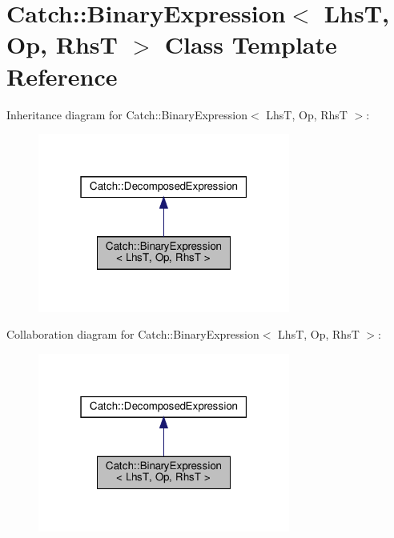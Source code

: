 \hypertarget{classCatch_1_1BinaryExpression}{}\section{Catch\+:\+:Binary\+Expression$<$ LhsT, Op, RhsT $>$ Class Template Reference}
\label{classCatch_1_1BinaryExpression}


Inheritance diagram for Catch\+:\+:Binary\+Expression$<$ LhsT, Op, RhsT $>$\+:\nopagebreak
\begin{figure}[H]
\begin{center}
\leavevmode
\includegraphics[width=235pt]{classCatch_1_1BinaryExpression__inherit__graph}
\end{center}
\end{figure}


Collaboration diagram for Catch\+:\+:Binary\+Expression$<$ LhsT, Op, RhsT $>$\+:\nopagebreak
\begin{figure}[H]
\begin{center}
\leavevmode
\includegraphics[width=235pt]{classCatch_1_1BinaryExpression__coll__graph}
\end{center}
\end{figure}
